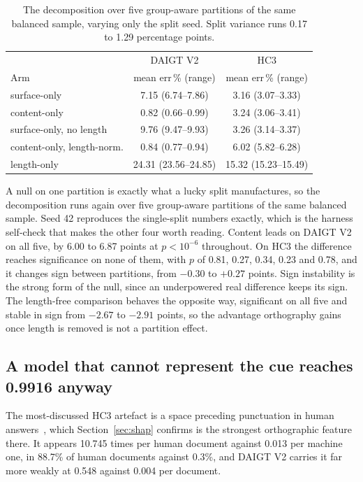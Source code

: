 \begin{table}[!ht]
\centering
\caption{The decomposition over five group-aware partitions of the same balanced sample, varying only the split seed. Split variance runs 0.17 to 1.29 percentage points.}
\label{tab:multisplit}
\footnotesize
\setlength{\tabcolsep}{3.5pt}
\begin{tabular}{@{}lcc@{}}
\toprule
& DAIGT V2 & HC3 \\
Arm & mean err\,\% (range) & mean err\,\% (range) \\
\midrule
surface-only & 7.15 (6.74--7.86) & 3.16 (3.07--3.33) \\
content-only & 0.82 (0.66--0.99) & 3.24 (3.06--3.41) \\
surface-only, no length & 9.76 (9.47--9.93) & 3.26 (3.14--3.37) \\
content-only, length-norm. & 0.84 (0.77--0.94) & 6.02 (5.82--6.28) \\
length-only & 24.31 (23.56--24.85) & 15.32 (15.23--15.49) \\
\bottomrule
\end{tabular}
\end{table}

A null on one partition is exactly what a lucky split manufactures, so the decomposition runs again over five group-aware partitions of the same balanced sample. Seed 42 reproduces the single-split numbers exactly, which is the harness self-check that makes the other four worth reading. Content leads on DAIGT V2 on all five, by 6.00 to 6.87 points at $p < 10^{-6}$ throughout. On HC3 the difference reaches significance on none of them, with $p$ of 0.81, 0.27, 0.34, 0.23 and 0.78, and it changes sign between partitions, from $-0.30$ to $+0.27$ points. Sign instability is the strong form of the null, since an underpowered real difference keeps its sign. The length-free comparison behaves the opposite way, significant on all five and stable in sign from $-2.67$ to $-2.91$ points, so the advantage orthography gains once length is removed is not a partition effect.

\subsection{A model that cannot represent the cue reaches 0.9916 anyway}
\label{sec:tokenisation}

The most-discussed HC3 artefact is a space preceding punctuation in human answers~\cite{Tian2023multiscale}, which Section~\ref{sec:shap} confirms is the strongest orthographic feature there. It appears 10.745 times per human document against 0.013 per machine one, in 88.7\% of human documents against 0.3\%, and DAIGT V2 carries it far more weakly at 0.548 against 0.004 per document.

